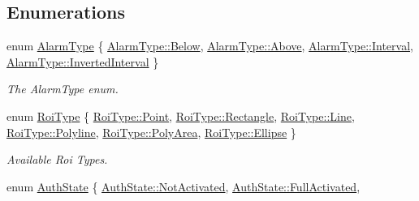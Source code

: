 \subsection*{Enumerations}
\begin{DoxyCompactItemize}
\item 
enum \hyperlink{namespacewtl_ac9fb2a665b6cd51719a16aba276874f2}{Alarm\+Type} \{ \hyperlink{namespacewtl_ac9fb2a665b6cd51719a16aba276874f2ae59dd8d25c0b6bb6697eac0617ccd412}{Alarm\+Type\+::\+Below}, 
\hyperlink{namespacewtl_ac9fb2a665b6cd51719a16aba276874f2a5b469fd01889ec12f1e84c6e66829fc1}{Alarm\+Type\+::\+Above}, 
\hyperlink{namespacewtl_ac9fb2a665b6cd51719a16aba276874f2ad16dd01adf735ed9b87eebff5fc39ce5}{Alarm\+Type\+::\+Interval}, 
\hyperlink{namespacewtl_ac9fb2a665b6cd51719a16aba276874f2a5a2c5fcca1c5bdaac52bec911f549c67}{Alarm\+Type\+::\+Inverted\+Interval}
 \}\begin{DoxyCompactList}\small\item\em The Alarm\+Type enum. \end{DoxyCompactList}
\item 
enum \hyperlink{namespacewtl_aeaf0390c682c56122c5c9c43b5c2cc65}{Roi\+Type} \{ \newline
\hyperlink{namespacewtl_aeaf0390c682c56122c5c9c43b5c2cc65a2a3cd5946cfd317eb99c3d32e35e2d4c}{Roi\+Type\+::\+Point}, 
\hyperlink{namespacewtl_aeaf0390c682c56122c5c9c43b5c2cc65ace9291906a4c3b042650b70d7f3b152e}{Roi\+Type\+::\+Rectangle}, 
\hyperlink{namespacewtl_aeaf0390c682c56122c5c9c43b5c2cc65a4803e6b9e63dabf04de980788d6a13c4}{Roi\+Type\+::\+Line}, 
\hyperlink{namespacewtl_aeaf0390c682c56122c5c9c43b5c2cc65af8fb02b84176d0b0f0007abfd9264fb9}{Roi\+Type\+::\+Polyline}, 
\newline
\hyperlink{namespacewtl_aeaf0390c682c56122c5c9c43b5c2cc65a3bfc7622ad17182685bae616ad914f8a}{Roi\+Type\+::\+Poly\+Area}, 
\hyperlink{namespacewtl_aeaf0390c682c56122c5c9c43b5c2cc65a119518c2134c46108179369f0ce81fa2}{Roi\+Type\+::\+Ellipse}
 \}\begin{DoxyCompactList}\small\item\em Available Roi Types. \end{DoxyCompactList}
\item 
enum \hyperlink{namespacewtl_a74cc3b258b8e82a1d6e032fb4c937353}{Auth\+State} \{ \newline
\hyperlink{namespacewtl_a74cc3b258b8e82a1d6e032fb4c937353ac1d762327a6a0b6c4ff34fddba5ca029}{Auth\+State\+::\+Not\+Activated}, 
\hyperlink{namespacewtl_a74cc3b258b8e82a1d6e032fb4c937353a6b714c8e4a3a2f600837e11ea6510fca}{Auth\+State\+::\+Full\+Activated}, 

\end{DoxyCompactItemize}
